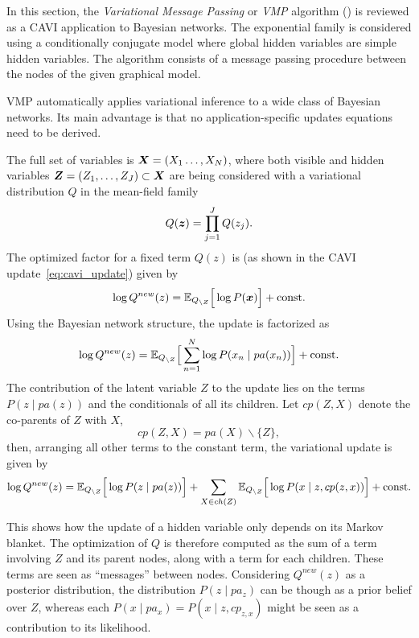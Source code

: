 
In this section, the \emph{Variational Message Passing} or \emph{VMP} algorithm (\cite{winn2005variational, bishop2003vibes}) is reviewed as a CAVI application to Bayesian networks. The exponential family is considered using a conditionally conjugate model where global hidden variables are simple hidden variables. The algorithm consists of a message passing procedure between the nodes of the given graphical model.

VMP automatically applies variational inference to a wide class of Bayesian networks. Its main advantage is that no application-specific updates equations need to be derived.

The full set of variables is \( \bm{X} = (X_1\dots,X_N) \), where both visible and hidden variables \( \bm{Z} = (Z_1,\dots,Z_J) \subset \bm{X}\) are being considered with a variational distribution \( Q \) in the mean-field family
\[
   Q(\bm{z}) = \prod_{j=1}^J Q(z_j).
\]
The optimized factor for a fixed term \(Q(z)\) is (as shown in the CAVI update~\ref{eq:cavi_update}) given by
\begin{equation}\label{eq:vmp_update}
   \log Q^{new}(z) = \mathbb{E}_{Q_{\backslash Z}}\Big[\log P(\bm{x})\Big] + \text{const.}
\end{equation}
Using the Bayesian network structure, the update is factorized as
\[
  \log Q^{new}(z) = \mathbb{E}_{Q_{\backslash Z}}\Big[ \sum_{n=1}^N \log P(x_n \mid pa(x_n))\Big] + \text{const.}
\]
The contribution of the latent variable \(Z\) to the update lies on the terms \( P(z \mid pa(z)) \) and the conditionals of all its children. Let \(cp(Z,X)\) denote the co-parents of \(Z\) with \(X\),
\[
  cp(Z,X) = pa(X)\backslash \{Z\},
\]
then, arranging all other terms to the constant term, the variational update is given by
\begin{equation}\label{eq:vmp_update_open}
   \log Q^{new}(z) = \mathbb{E}_{Q_{\backslash Z}}\Big[\log P(z \mid pa(z))\Big] + \sum_{X \in ch(Z)} \mathbb{E}_{Q_{\backslash Z}}\Big[\log P(x \mid z,cp(z, x))\Big] + \text{const.}
\end{equation}

This shows how the update of a hidden variable only depends on its Markov blanket. The optimization of \( Q \) is therefore computed as the sum of a term involving \( Z \) and its parent nodes, along with a term for each children. These terms are seen as ``messages'' between nodes. Considering \(Q^{new}(z)\) as a posterior distribution, the distribution \( P(z \mid pa_z) \) can be though as a prior belief over \( Z \), whereas each \( P(x \mid pa_x) = P(x \mid z, cp_{z,x})\) might be seen as a contribution to its likelihood.

